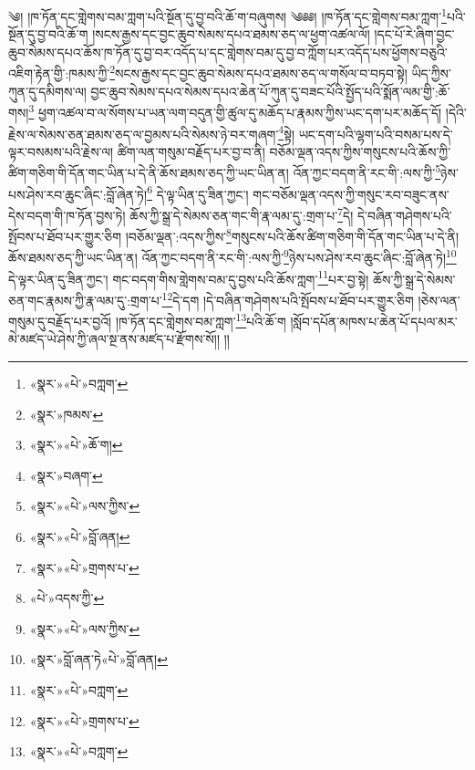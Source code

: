 ༄། །ཁ་ཏོན་དང་གླེགས་བམ་ཀླག་པའི་སྔོན་དུ་བྱ་བའི་ཆོ་ག་བཞུགས། ༄༅༅། །ཁ་ཏོན་དང་གླེགས་བམ་ཀླག་\footnote{«སྣར་»«པེ་»བཀླག་}པའི་སྔོན་དུ་བྱ་བའི་ཆོ་ག །སངས་རྒྱས་དང་བྱང་ཆུབ་སེམས་དཔའ་ཐམས་ཅད་ལ་ཕྱག་འཚལ་ལོ། །དང་པོ་རེ་ཞིག་བྱང་ཆུབ་སེམས་དཔའ་ཆོས་ཁ་ཏོན་དུ་བྱ་བར་འདོད་པ་དང་གླེགས་བམ་དུ་བྱ་བ་ཀློག་པར་འདོད་པས་ཕྱོགས་བཅུའི་འཇིག་རྟེན་གྱི་:ཁམས་ཀྱི་\footnote{«སྣར་»ཁམས་}སངས་རྒྱས་དང་བྱང་ཆུབ་སེམས་དཔའ་ཐམས་ཅད་ལ་གསོལ་བ་བཏབ་སྟེ། ཡིད་ཀྱིས་ཀུན་དུ་དམིགས་ལ། བྱང་ཆུབ་སེམས་དཔའ་སེམས་དཔའ་ཆེན་པོ་ཀུན་དུ་བཟང་པོའི་སྤྱོད་པའི་སྨོན་ལམ་གྱི་:ཆོ་གས།\footnote{«སྣར་»«པེ་»ཆོ་ག།} ཕྱག་འཚལ་བ་ལ་སོགས་པ་ཡན་ལག་བདུན་གྱི་ཚུལ་དུ་མཆོད་པ་རྣམས་ཀྱིས་ཡང་དག་པར་མཆོད་དོ། །དེའི་རྗེས་ལ་སེམས་ཅན་ཐམས་ཅད་ལ་བྱམས་པའི་སེམས་ཉེ་བར་གཞག་\footnote{«སྣར་»བཞག་}སྟེ། ཡང་དག་པའི་ལྷག་པའི་བསམ་པས་དེ་ལྟར་བསམས་པའི་རྗེས་ལ། ཚིག་ལན་གསུམ་བརྗོད་པར་བྱ་བ་ནི། བཅོམ་ལྡན་འདས་ཀྱིས་གསུངས་པའི་ཆོས་ཀྱི་ཚིག་གཅིག་གི་དོན་གང་ཡིན་པ་དེ་ནི་ཆོས་ཐམས་ཅད་ཀྱི་ཡང་ཡིན་ན། འོན་ཀྱང་བདག་ནི་རང་གི་:ལས་ཀྱི་\footnote{«སྣར་»«པེ་»ལས་ཀྱིས་}ཉེས་པས་ཤེས་རབ་ཆུང་ཞིང་:བློ་ཞེན་ཏེ།\footnote{«སྣར་»«པེ་»བློ་ཞན།} དེ་ལྟ་ཡིན་དུ་ཟིན་ཀྱང་། གང་བཅོམ་ལྡན་འདས་ཀྱི་གསུང་རབ་བཟུང་ནས་དེས་བདག་གི་ཁ་ཏོན་བྱས་ཏེ། ཆོས་ཀྱི་སྒྲ་དེ་སེམས་ཅན་གང་གི་རྣ་ལམ་དུ་:གྲག་པ་\footnote{«སྣར་»«པེ་»གྲགས་པ་}དེ། དེ་བཞིན་གཤེགས་པའི་སྤོབས་པ་ཐོབ་པར་གྱུར་ཅིག །བཅོམ་ལྡན་:འདས་ཀྱིས་\footnote{«པེ་»འདས་ཀྱི་}གསུངས་པའི་ཆོས་ཚིག་གཅིག་གི་དོན་གང་ཡིན་པ་དེ་ནི། ཆོས་ཐམས་ཅད་ཀྱི་ཡང་ཡིན་ན། འོན་ཀྱང་བདག་ནི་རང་གི་:ལས་ཀྱི་\footnote{«སྣར་»«པེ་»ལས་ཀྱིས་}ཉེས་པས་ཤེས་རབ་ཆུང་ཞིང་:བློ་ཞེན་ཏེ།\footnote{«སྣར་»བློ་ཞན་ཏེ«པེ་»བློ་ཞན།} དེ་ལྟར་ཡིན་དུ་ཟིན་ཀྱང་། གང་བདག་གིས་གླེགས་བམ་དུ་བྱས་པའི་ཆོས་ཀླག་\footnote{«སྣར་»«པེ་»བཀླག་}པར་བྱ་སྟེ། ཆོས་ཀྱི་སྒྲ་དེ་སེམས་ཅན་གང་རྣམས་ཀྱི་རྣ་ལམ་དུ་:གྲག་པ་\footnote{«སྣར་»«པེ་»གྲགས་པ་}དེ་དག །དེ་བཞིན་གཤེགས་པའི་སྤོབས་པ་ཐོབ་པར་གྱུར་ཅིག །ཅེས་ལན་གསུམ་དུ་བརྗོད་པར་བྱའོ། །ཁ་ཏོན་དང་གླེགས་བམ་ཀླག་\footnote{«སྣར་»«པེ་»བཀླག་}པའི་ཆོ་ག །སློབ་དཔོན་མཁས་པ་ཆེན་པོ་དཔལ་མར་མེ་མཛད་ཡེ་ཤེས་ཀྱི་ཞལ་སྔ་ནས་མཛད་པ་རྫོགས་སོ།། །།